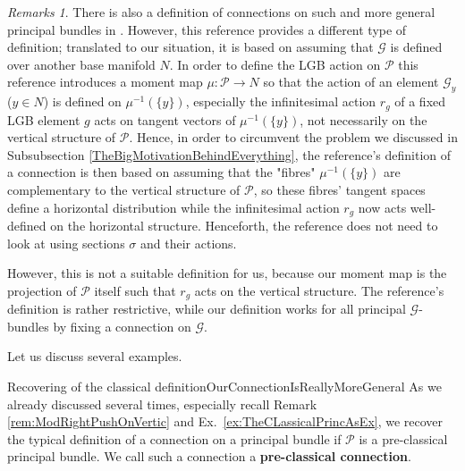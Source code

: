 \documentclass[a4paper,oneside,11pt,bibliography=totoc]{scrartcl}
\theoremstyle{plain}
\theoremstyle{remark}
\newtheorem{remark}[theorem]{Remarks}
\theoremstyle{definition}
\begin{document}
\begin{remark}
\leavevmode\newline
There is also a definition of connections on such and more general principal bundles in \cite[\S 5.7, paragraph before Prop.\ 5.38, page 148]{GroupoidBasedPrincipalBundles}. However, this reference provides a different type of definition; translated to our situation, it is based on assuming that $\mathcal{G}$ is defined over another base manifold $N$. In order to define the LGB action on $\mathcal{P}$ this reference introduces a moment map $\mu: \mathcal{P} \to N$ so that the action of an element $\mathcal{G}_y$ ($y \in N$) is defined on $\mu^{-1}(\{y\})$, especially the infinitesimal action $r_g$ of a fixed LGB element $g$ acts on tangent vectors of $\mu^{-1}(\{y\})$, not necessarily on the vertical structure of $\mathcal{P}$. Hence, in order to circumvent the problem we discussed in Subsubsection \ref{TheBigMotivationBehindEverything}, the reference's definition of a connection is then based on assuming that the "fibres" $\mu^{-1}(\{y\})$ are complementary to the vertical structure of $\mathcal{P}$, so these fibres' tangent spaces define a horizontal distribution while the infinitesimal action $r_g$ now acts well-defined on the horizontal structure. Henceforth, the reference does not need to look at using sections $\sigma$ and their actions.

However, this is not a suitable definition for us, because our moment map is the projection of $\mathcal{P}$ itself such that $r_g$ acts on the vertical structure. The reference's definition is rather restrictive, while our definition works for all principal $\mathcal{G}$-bundles by fixing a connection on $\mathcal{G}$.
\end{remark}

Let us discuss several examples.

\begin{examples}{Recovering of the classical definition}{OurConnectionIsReallyMoreGeneral}
As we already discussed several times, especially recall Remark \ref{rem:ModRightPushOnVertic} and Ex.\ \ref{ex:TheCLassicalPrincAsEx}, we recover the typical definition of a connection on a principal bundle if $\mathcal{P}$ is a pre-classical principal bundle. We call such a connection a \textbf{pre-classical connection}.
\end{examples}
\end{document}
